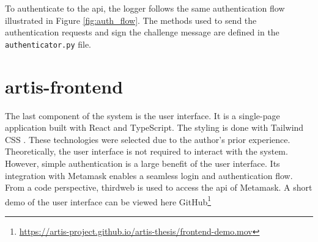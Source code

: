 To authenticate to the \gls{api}, the logger follows the same authentication flow illustrated in Figure \ref{fig:auth_flow}. The methods used to send the authentication requests and sign the challenge message are defined in the \texttt{authenticator.py} file.

\clearpage
\section{artis-frontend}
The last component of the system is the user interface. It is a single-page application built with React \cite{react} and TypeScript. The styling is done with Tailwind CSS \cite{tailwindcss}. These technologies were selected due to the author's prior experience. Theoretically, the user interface is not required to interact with the system. However, simple authentication is a large benefit of the user interface. Its integration with Metamask \cite{metamask} enables a seamless login and authentication flow. From a code perspective, thirdweb \cite{thirdweb} is used to access the \gls{api} of Metamask. A short demo of the user interface can be viewed here GitHub\footnote{\href{https://artis-project.github.io/artis-thesis/frontend-demo.mov}{https://artis-project.github.io/artis-thesis/frontend-demo.mov}}

